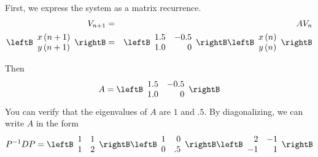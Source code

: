 \begin{solution}
First, we express the system as a matrix recurrence. 
\begin{eqnarray*}
V_{n+1} &=& AV_{n}\\
\leftB
\begin{array}{c}
x\left( n+1\right) \\
y\left( n+1\right)
\end{array}
\rightB &=&\leftB 
\begin{array}{rr}
1.5 & -0.5 \\
1.0 & 0
\end{array}
\rightB \leftB
\begin{array}{c}
x\left( n\right) \\
y\left( n\right)
\end{array}
\rightB
\end{eqnarray*}

Then
\begin{equation*}
A
=
\leftB 
\begin{array}{rr}
1.5 & -0.5 \\
1.0 & 0
\end{array}
\rightB
\end{equation*}
You can verify that the eigenvalues of $A$ are $1$ and $.5$. By diagonalizing, we can write $A$ in the form
\begin{equation*}
P^{-1} D P =
\leftB
\begin{array}{rr}
1 & 1 \\
1 & 2
\end{array}
\rightB \leftB
\begin{array}{rr}
1 & 0 \\
0 & .5
\end{array}
\rightB \leftB
\begin{array}{rr}
2 & -1 \\
-1 & 1
\end{array}
\rightB
\end{equation*}


\end{solution}
